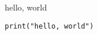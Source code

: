 \documentclass{article}
\begin{document}
hello, world

\begin{listing}
\begin{verbatim}
print("hello, world")
\end{verbatim}
\end{listing}
\end{document}
